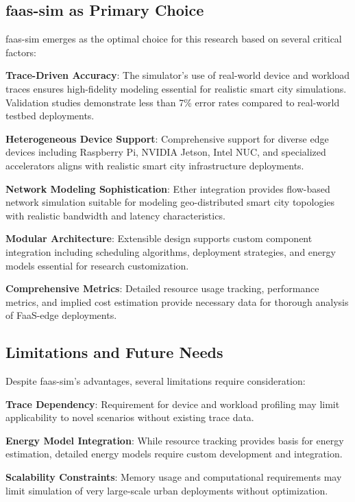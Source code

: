 \subsection{faas-sim as Primary Choice}

faas-sim emerges as the optimal choice for this research based on several critical factors:

\textbf{Trace-Driven Accuracy}: The simulator's use of real-world device and workload traces ensures high-fidelity modeling essential for realistic smart city simulations. Validation studies demonstrate less than 7\% error rates compared to real-world testbed deployments.

\textbf{Heterogeneous Device Support}: Comprehensive support for diverse edge devices including Raspberry Pi, NVIDIA Jetson, Intel NUC, and specialized accelerators aligns with realistic smart city infrastructure deployments.

\textbf{Network Modeling Sophistication}: Ether integration provides flow-based network simulation suitable for modeling geo-distributed smart city topologies with realistic bandwidth and latency characteristics.

\textbf{Modular Architecture}: Extensible design supports custom component integration including scheduling algorithms, deployment strategies, and energy models essential for research customization.

\textbf{Comprehensive Metrics}: Detailed resource usage tracking, performance metrics, and implied cost estimation provide necessary data for thorough analysis of FaaS-edge deployments.

\subsection{Limitations and Future Needs}

Despite faas-sim's advantages, several limitations require consideration:

\textbf{Trace Dependency}: Requirement for device and workload profiling may limit applicability to novel scenarios without existing trace data.

\textbf{Energy Model Integration}: While resource tracking provides basis for energy estimation, detailed energy models require custom development and integration.

\textbf{Scalability Constraints}: Memory usage and computational requirements may limit simulation of very large-scale urban deployments without optimization.

